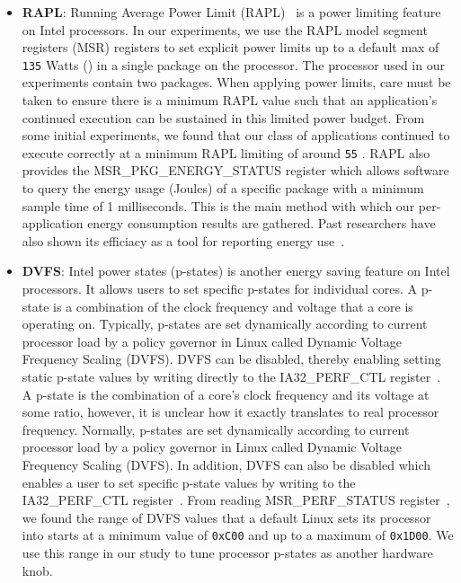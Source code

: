 \begin{itemize}


\item \textbf{RAPL}: Running Average Power Limit (RAPL)~\cite{intel_rapl} is a
power limiting feature on Intel processors.
In our experiments, we use the RAPL model segment registers (MSR) registers to
set explicit power limits up to a default max of \texttt{135} Watts (\watt) in
a single package on the processor. The processor used in our experiments
contain two packages. When applying power limits, care must be taken to ensure
there is a minimum RAPL value such that an application's continued execution
can be sustained in this limited power budget.
From some initial experiments, we found that our class of applications
continued to execute correctly at a minimum RAPL limiting of around \texttt{55}
\watt. RAPL also provides the MSR\_PKG\_ENERGY\_STATUS register which allows
software to query the energy usage (Joules) of a specific package with a
minimum sample time of 1 milliseconds.
This is the main method with which our per-application energy consumption
results are gathered. Past researchers have also shown its efficiacy as a tool for reporting energy use~\cite{}.

\item \textbf{DVFS}: Intel power states (p-states) is another energy saving
feature on Intel processors.
It allows users to set specific p-states for individual cores.
A p-state is a combination of the clock frequency and voltage that a core is
operating on. Typically,  p-states are set dynamically according to current
processor load by a policy governor in Linux called Dynamic Voltage Frequency
Scaling (DVFS). DVFS can be disabled, thereby enabling setting static p-state
values by writing directly to the IA32\_PERF\_CTL register~\cite{intel_msr}.
A p-state is the combination of a core's clock frequency and its voltage at
some ratio, however, it is unclear how it exactly translates to real processor
frequency.
Normally, p-states are set dynamically according to current processor load by
a policy governor in Linux called Dynamic Voltage Frequency Scaling (DVFS).
In addition, DVFS can also be disabled which enables a user to set specific
p-state values by writing to the IA32\_PERF\_CTL register~\cite{intel_msr}.
From reading MSR\_PERF\_STATUS register~\cite{intel_msr}, we found the range of
DVFS values that a default Linux sets its processor into starts at a minimum
value of \texttt{0xC00} and up to a maximum of \texttt{0x1D00}. We use this
range in our study to tune processor p-states as another hardware knob.
\end{itemize}

